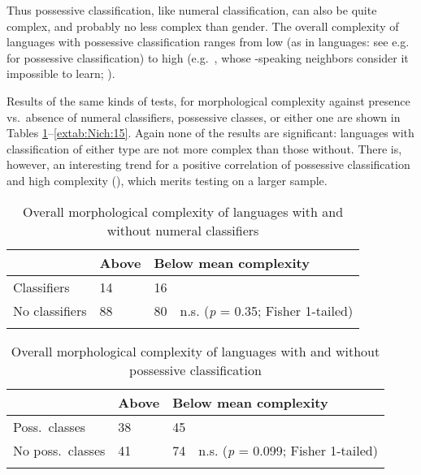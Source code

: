 \documentclass[output=collectionpaper]{langsci/langscibook}
\begin{document}
Thus possessive classification, like numeral classification, can also be quite complex, and probably no less complex than gender. The overall complexity of languages with possessive classification ranges from low (as in  languages: see e.g.\ \citealt{Wilson1982} for  possessive classification) to high (e.g.\ , whose -speaking neighbors consider it impossible to learn; \citealt[51]{Thurston1982}).

Results of the same kinds of tests, for morphological complexity against presence vs.\ absence of numeral classifiers, possessive classes, or either one are shown in Tables \ref{extab:Nich:13}--\ref{extab:Nich:15}. Again none of the results are significant: languages with classification of either type are not more complex than those without. There is, however, an interesting trend for a positive correlation of possessive classification and high complexity (), which merits testing on a larger sample.


\begin{table}[b]
\caption{Overall morphological complexity of languages with and without numeral classifiers}
\label{extab:Nich:13}

\begin{tabularx}{\textwidth}{p{2.7cm}Xp{1.3cm}l}
\lsptoprule
			 &	Above 	 &	\multicolumn{2}{l}{Below mean complexity} \\
			 \midrule
	Classifiers	 &	14	 &	16 \\
	No classifiers	 &	88	 &	80	 &n.s. (\textit{p} = 0.35; Fisher 1-tailed) \\
\lspbottomrule\end{tabularx}
\end{table}


\begin{table}
\caption{Overall morphological complexity of languages with and without possessive classification}
\label{extab:Nich:14}

\begin{tabularx}{\textwidth}{p{2.7cm}Xp{1.3cm}l}
\lsptoprule
				 &Above 	 &	\multicolumn{2}{l}{Below mean complexity} \\
			 \midrule
	Poss.\ classes	 &	38	 &	45 \\
	No poss.\ classes	 &41	 &	74	 &n.s. (\textit{p} = 0.099; Fisher 1-tailed)	  \\
\lspbottomrule\end{tabularx}
\end{table}
\end{document}
